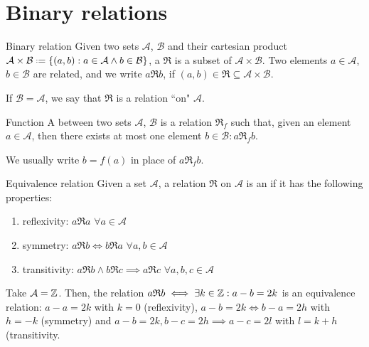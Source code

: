 
\section{Binary relations}

\begin{definition}{Binary relation}{}
  Given two sets $ \mathcal{A} $, $ \mathcal{B} $ and their cartesian product $ \mathcal{A} \times \mathcal{B} \defeq \{(a,b) : a \in \mathcal{A} \land b \in \mathcal{B}\} $, a  $ \mathfrak{R} $ is a subset of $ \mathcal{A} \times \mathcal{B} $. Two elements $ a \in \mathcal{A} $, $ b \in \mathcal{B} $ are related, and we write $ a \mathfrak{R} b $, if $ (a,b) \in \mathfrak{R} \subseteq \mathcal{A} \times \mathcal{B} $.
\end{definition}

If $ \mathcal{B} = \mathcal{A} $, we say that $ \mathfrak{R} $ is a relation ``on" $ \mathcal{A} $.

\begin{definition}{Function}{}
  A  between two sets $ \mathcal{A} $, $ \mathcal{B} $ is a relation $ \mathfrak{R}_f $ such that, given an element $ a \in \mathcal{A} $, then there exists at most one element $ b \in \mathcal{B} : a \mathfrak{R}_f b $.
\end{definition}

We usually write $ b = f(a) $ in place of $ a \mathfrak{R}_f b $.

\begin{definition}{Equivalence relation}{}
  Given a set $ \mathcal{A} $, a relation $ \mathfrak{R} $ on $ \mathcal{A} $ is an  if it has the following properties:
  \begin{enumerate}
    \item reflexivity: $ a \mathfrak{R} a \,\,\forall a \in \mathcal{A} $
    \item symmetry: $ a \mathfrak{R} b \iff b \mathfrak{R} a \,\,\forall a,b \in \mathcal{A} $
    \item transitivity: $ a \mathfrak{R} b \land b \mathfrak{R} c \implies a \mathfrak{R} c \,\,\forall a,b,c \in \mathcal{A} $
  \end{enumerate}
\end{definition}

\begin{example}{}{}
  Take $ \mathcal{A} = \mathbb{Z} $. Then, the relation $ a \mathfrak{R} b \iff \exists k \in \mathbb{Z} : a - b = 2k $ is an equivalence relation: $ a - a = 2k $ with $ k = 0 $ (reflexivity), $ a - b = 2k \iff b - a = 2h $ with $ h = -k $ (symmetry) and $ a - b = 2k , b - c = 2h \implies a - c = 2l $ with $ l = k + h $ (transitivity.
\end{example}

